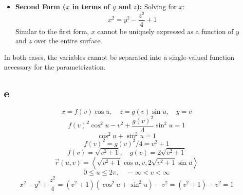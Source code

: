 \documentclass{report}
\begin{document}
{\begin{itemize}
        \item \textbf{Second Form (\( x \) in terms of \( y \) and \( z \)):} Solving for \( x \):
        \[ x^2 = y^2 - \frac{z^2}{4} + 1 \]
        Similar to the first form, \( x \) cannot be uniquely expressed as a function of \( y \) and \( z \) over the entire surface.
    \end{itemize}

    In both cases, the variables cannot be separated into a single-valued function necessary for the parametrization. \\
    \subsection*{e}
    \[ x = f(v) \cos u, \quad z = g(v) \sin u, \quad y = v \] 
    \[ f(v)^2 \cos^2 u - v^2 + \frac{g(v)^2}{4} \sin^2 u = 1 \] 
    \[ \cos^2 u + \sin^2 u = 1 \]
    \[ f(v)^2 = g(v)^2/4 = v^2 + 1 \] 
    \[ f(v) = \sqrt{v^2 + 1}, \quad g(v) = 2\sqrt{v^2 + 1} \] 
    \[
    \vec{r}(u, v) = \left\langle \sqrt{v^2 + 1} \cos u, v, 2\sqrt{v^2 + 1} \sin u \right\rangle \] 
    \[ 0 \leq u \leq 2\pi, \quad -\infty < v < \infty \]
    \[ x^2 - y^2 + \frac{z^2}{4} = (v^2 + 1)(\cos^2 u + \sin^2 u) - v^2 = (v^2 + 1) - v^2 = 1 \] 

}

\newpage


\end{document}
